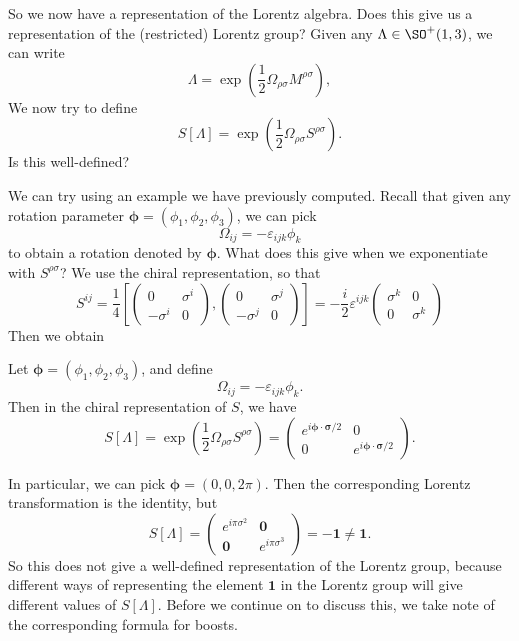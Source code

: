 \documentclass[a4paper]{article}
\begin{document}
So we now have a representation of the Lorentz algebra. Does this give us a representation of the (restricted) Lorentz group? Given any $\Lambda \in \SO^+(1, 3)$, we can write
\[
  \Lambda = \exp\left(\frac{1}{2}\Omega_{\rho\sigma} M^{\rho\sigma}\right),
\]
We now try to define
\[
  S[\Lambda] = \exp\left(\frac{1}{2} \Omega_{\rho\sigma} S^{\rho\sigma}\right).
\]
Is this well-defined?

We can try using an example we have previously computed. Recall that given any rotation parameter $\boldsymbol\phi = (\phi_1, \phi_2, \phi_3)$, we can pick
\[
  \Omega_{ij} = - \varepsilon_{ijk} \phi_k
\]
to obtain a rotation denoted by $\boldsymbol\phi$. What does this give when we exponentiate with $S^{\rho\sigma}$? We use the chiral representation, so that
\[
  S^{ij} = \frac{1}{4}\left[
    \begin{pmatrix}
      0 & \sigma^i\\
      -\sigma^i & 0
    \end{pmatrix},
    \begin{pmatrix}
      0 & \sigma^j\\
      -\sigma^j & 0
  \end{pmatrix}\right] = -\frac{i}{2} \varepsilon^{ijk}
  \begin{pmatrix}
    \sigma^k & 0\\
    0 & \sigma^k
  \end{pmatrix}
\]
Then we obtain
\begin{prop}
  Let $\boldsymbol\phi = (\phi_1, \phi_2, \phi_3)$, and define
  \[
    \Omega_{ij} = - \varepsilon_{ijk} \phi_k.
  \]
  Then in the chiral representation of $S$, we have
  \[
    S[\Lambda] = \exp\left(\frac{1}{2} \Omega_{\rho\sigma} S^{\rho \sigma}\right)
    =
    \begin{pmatrix}
      e^{i\boldsymbol\phi \cdot \boldsymbol\sigma/2} & 0\\
      0 & e^{i \boldsymbol\phi \cdot \boldsymbol \sigma/2}
    \end{pmatrix}.
  \]
\end{prop}
In particular, we can pick $\boldsymbol\phi = (0, 0, 2\pi)$. Then the corresponding Lorentz transformation is the identity, but
\[
  S[\Lambda] =
  \begin{pmatrix}
    e^{i\pi \sigma^2} & \mathbf{0}\\
    \mathbf{0} & e^{i\pi \sigma^3}
  \end{pmatrix} = -\mathbf{1} \not= \mathbf{1}.
\]
So this does not give a well-defined representation of the Lorentz group, because different ways of representing the element $\mathbf{1}$ in the Lorentz group will give different values of $S[\Lambda]$. Before we continue on to discuss this, we take note of the corresponding formula for boosts.
\end{document}
